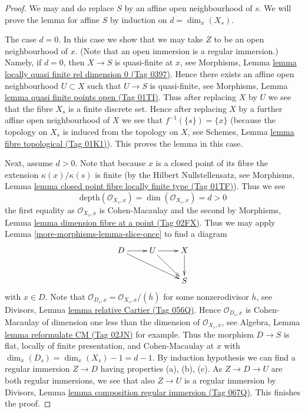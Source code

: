 \documentclass{amsart}
\theoremstyle{plain}
\theoremstyle{definition}
\theoremstyle{remark}
\numberwithin{equation}{subsection}
\begin{document}
\begin{proof}
We may and do replace $S$ by an affine open neighbourhood of $s$.
We will prove the lemma for affine $S$ by induction on $d = \dim_x(X_s)$.

\medskip\noindent
The case $d = 0$. In this case we show that we may take $Z$ to be
an open neighbourhood of $x$. (Note that an open immersion is
a regular immersion.) Namely, if $d = 0$, then $X \to S$
is quasi-finite at $x$, see
Morphisms, Lemma \href{https://stacks.math.columbia.edu/tag/0397}{lemma locally quasi finite rel dimension 0 (Tag 0397)}.
Hence there exists an affine open neighbourhood $U \subset X$ such
that $U \to S$ is quasi-finite, see
Morphisms, Lemma \href{https://stacks.math.columbia.edu/tag/01TI}{lemma quasi finite points open (Tag 01TI)}.
Thus after replacing $X$ by $U$ we see that the fibre $X_s$ is a finite
discrete set. Hence after replacing $X$ by a further affine open neighbourhood
of $X$ we see that $f^{-1}(\{s\}) = \{x\}$ (because the topology
on $X_s$ is induced from the topology on $X$, see
Schemes, Lemma \href{https://stacks.math.columbia.edu/tag/01K1}{lemma fibre topological (Tag 01K1)}).
This proves the lemma in this case.

\medskip\noindent
Next, assume $d > 0$. Note that because $x$ is a closed point of its
fibre the extension $\kappa(x)/\kappa(s)$ is finite (by the
Hilbert Nullstellensatz, see
Morphisms, Lemma \href{https://stacks.math.columbia.edu/tag/01TF}{lemma closed point fibre locally finite type (Tag 01TF)}).
Thus we see
$$
\text{depth}(\mathcal{O}_{X_s, x}) = \dim(\mathcal{O}_{X_s, x}) = d > 0
$$
the first equality as $\mathcal{O}_{X_s, x}$ is Cohen-Macaulay and
the second by
Morphisms, Lemma \href{https://stacks.math.columbia.edu/tag/02FX}{lemma dimension fibre at a point (Tag 02FX)}.
Thus we may apply
Lemma \ref{more-morphisms-lemma-slice-once}
to find a diagram
$$
\xymatrix{
D \ar[r] \ar[rrd] & U \ar[r] \ar[rd] & X \ar[d] \\
& & S
}
$$
with $x \in D$. Note that
$\mathcal{O}_{D_s, x} = \mathcal{O}_{X_s, x}/(\overline{h})$ for some
nonzerodivisor $\overline{h}$, see
Divisors, Lemma \href{https://stacks.math.columbia.edu/tag/056Q}{lemma relative Cartier (Tag 056Q)}.
Hence $\mathcal{O}_{D_s, x}$ is Cohen-Macaulay of dimension
one less than the dimension of $\mathcal{O}_{X_s, x}$, see
Algebra, Lemma \href{https://stacks.math.columbia.edu/tag/02JN}{lemma reformulate CM (Tag 02JN)}
for example. Thus the morphism $D \to S$ is flat,
locally of finite presentation, and Cohen-Macaulay at $x$ with
$\dim_x(D_s) = \dim_x(X_s) - 1 = d - 1$. By induction hypothesis
we can find a regular immersion $Z \to D$ having properties (a), (b), (c).
As $Z \to D \to U$ are both regular immersions, we see that also
$Z \to U$ is a regular immersion by
Divisors, Lemma \href{https://stacks.math.columbia.edu/tag/067Q}{lemma composition regular immersion (Tag 067Q)}.
This finishes the proof.
\end{proof}
\end{document}
